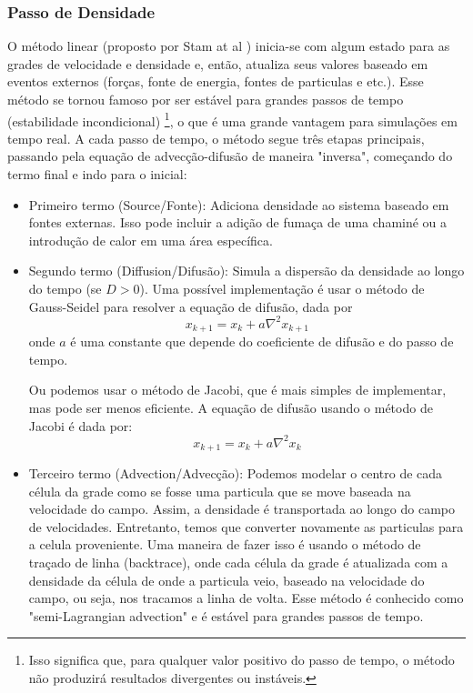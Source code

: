 \subsubsection*{Passo de Densidade}
O método linear (proposto por Stam at al \cite{Stam2003}) inicia-se com algum estado para as grades de velocidade e densidade e, então, atualiza seus valores baseado em eventos externos (forças, fonte de energia, fontes de particulas e etc.). Esse método se tornou famoso por ser estável para grandes passos de tempo (estabilidade incondicional) \footnote{Isso significa que, para qualquer valor positivo do passo de tempo, o método não produzirá resultados divergentes ou instáveis.}, o que é uma grande vantagem para simulações em tempo real. A cada passo de tempo, o método segue três etapas principais, passando pela equação de advecção-difusão de maneira "inversa", começando do termo final e indo para o inicial:

\begin{itemize}
  \item Primeiro termo (Source/Fonte): Adiciona densidade ao sistema baseado em fontes externas. Isso pode incluir a adição de fumaça de uma chaminé ou a introdução de calor em uma área específica.
  \item Segundo termo (Diffusion/Difusão): Simula a dispersão da densidade ao longo do tempo (se $D > 0$). Uma possível implementação é usar o método de Gauss-Seidel para resolver a equação de difusão, dada por 
    $$
    x_{k+1} = x_k + a \nabla^2 x_{k+1}
    $$
    onde $a$ é uma constante que depende do coeficiente de difusão e do passo de tempo. 

    Ou podemos usar o método de Jacobi, que é mais simples de implementar, mas pode ser menos eficiente. A equação de difusão usando o método de Jacobi é dada por:
    $$
    x_{k+1} = x_k + a \nabla^2 x_k
    $$

  \item Terceiro termo (Advection/Advecção): Podemos modelar o centro de cada célula da grade como se fosse uma particula que se move baseada na velocidade do campo. Assim, a densidade é transportada ao longo do campo de velocidades. Entretanto, temos que converter novamente as particulas para a celula proveniente. Uma maneira de fazer isso é usando o método de traçado de linha (backtrace), onde cada célula da grade é atualizada com a densidade da célula de onde a particula veio, baseado na velocidade do campo, ou seja, nos tracamos a linha de volta. Esse método é conhecido como "semi-Lagrangian advection" e é estável para grandes passos de tempo.

\end{itemize}

